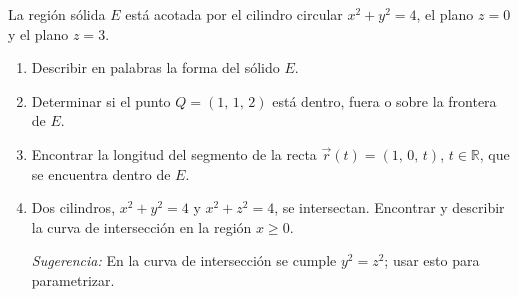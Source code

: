La región sólida $E$ está acotada por el cilindro circular $x^2 + y^2 = 4$, el plano $z = 0$ y el plano $z = 3$.
\begin{enumerate}
    \item Describir en palabras la forma del sólido $E$.
    \item Determinar si el punto $Q = (1,\, 1,\, 2)$ está dentro, fuera o sobre la frontera de $E$.
    \item Encontrar la longitud del segmento de la recta $\vec{r}(t) = (1,\, 0,\, t)$, $t \in \mathbb{R}$, que se encuentra dentro de $E$.
    \item Dos cilindros, $x^2 + y^2 = 4$ y $x^2 + z^2 = 4$, se intersectan. Encontrar y describir la curva de intersección en la región $x \geq 0$.

    \textit{Sugerencia:} En la curva de intersección se cumple $y^2 = z^2$; usar esto para parametrizar.
\end{enumerate}